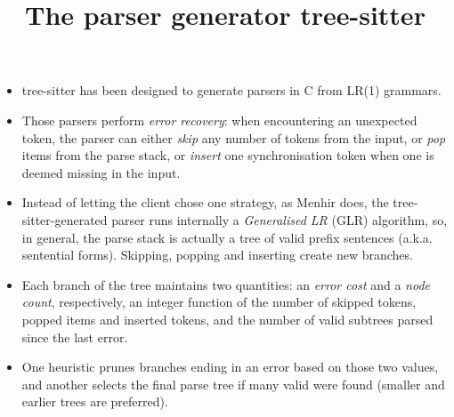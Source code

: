 \documentclass[wide]{slides}
\newcommand{\Menhir}[0]{\textsf{Menhir}}
\newcommand{\TreeSitter}[0]{\textsf{tree-sitter}}
\begin{document}
\begin{slide}
  \title{The parser generator tree-sitter}

  \begin{itemize}

    \item \TreeSitter{} has been designed to generate parsers in C
      from LR(1) grammars.

    \item Those parsers perform \emph{error recovery}: when
      encountering an unexpected token, the parser can either
      \emph{skip} any number of tokens from the input, or \emph{pop}
      items from the parse stack, or \emph{insert} one synchronisation
      token when one is deemed missing in the input.

    \item Instead of letting the client chose one strategy, as
      \Menhir{} does, the \TreeSitter\hyp{}generated parser runs
      internally a \emph{Generalised LR} (GLR) algorithm, so, in
      general, the parse stack is actually a tree of valid prefix
      sentences (a.k.a. sentential forms). Skipping, popping and
      inserting create new branches.

    \item Each branch of the tree maintains two quantities: an
      \emph{error cost} and a \emph{node count}, respectively, an
      integer function of the number of skipped tokens, popped
      items and inserted tokens, and the number of valid subtrees
      parsed since the last error.

    \item One heuristic prunes branches ending in an error based on
      those two values, and another selects the final parse tree if
      many valid were found (smaller and earlier trees are preferred).

  \end{itemize}

\end{slide}
\end{document}
